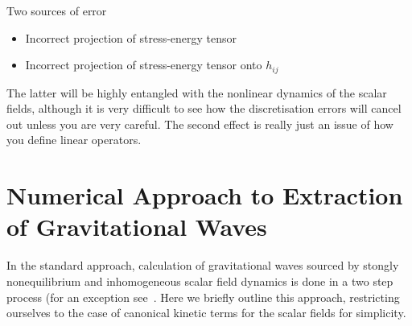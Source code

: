 \documentclass{revtex4}
\begin{document}
Two sources of error
\begin{itemize}
\item Incorrect projection of stress-energy tensor
\item Incorrect projection of stress-energy tensor onto $h_{ij}$
\end{itemize}
The latter will be highly entangled with the nonlinear dynamics of the scalar fields, although it is very difficult to see how the discretisation errors will cancel out unless you are very careful.
The second effect is really just an issue of how you define linear operators.

\section{Numerical Approach to Extraction of Gravitational Waves}
In the standard approach, calculation of gravitational waves sourced by stongly nonequilibrium and inhomogeneous scalar field dynamics is done in a two step process (for an exception see~\cite{Huang:HLattice,Bastero-Gil}.
Here we briefly outline this approach, restricting ourselves to the case of canonical kinetic terms for the scalar fields for simplicity.
\end{document}
